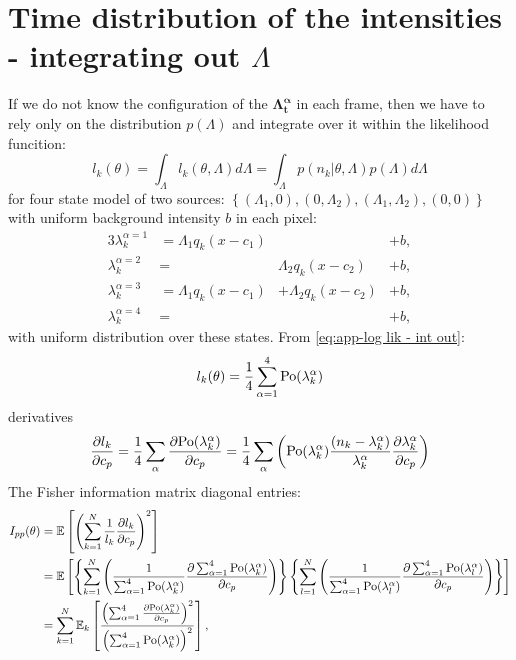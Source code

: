 
\section{Time distribution of the intensities - integrating out $\Lambda$}
\label{sub:Appendix Time-distribution-Integrating out}
If we do not know the configuration of the $\bm{\Lambda^\alpha_t}$ in each frame, then we have to rely only on the distribution $p(\Lambda)$ and integrate over it within the likelihood funcition:
%
\begin{equation}
	l_k(\theta)=\int_{\Lambda}l_k(\theta,\Lambda)d\Lambda=\int_{\Lambda}p(n_k|\theta,\Lambda)p(\Lambda)d\Lambda
	\label{eq:app-log lik - int out}
\end{equation}
%
for four state model of two sources: $\left\{ (\Lambda_1,0),(0,\Lambda_2),(\Lambda_1,\Lambda_2),(0,0)\right\}$ with uniform background intensity $b$ in each pixel: 
\begin{alignat}{3}
	\lambda_k^{\alpha=1}&=\Lambda_1q_k(x-c_1) & &+b,\nonumber\\ 
	\lambda_k^{\alpha=2}&=&\Lambda_2q_k(x-c_2) &+b,\nonumber\\ 
	\lambda_k^{\alpha=3}&=\Lambda_1q_k(x-c_1)&+\Lambda_2q_k(x-c_2)&+b,\nonumber\\ 
	\lambda_k^{\alpha=4}&=& &+b,
\end{alignat}
%
with uniform distribution over these states. From \autoref{eq:app-log lik - int out}:
%
\begin{equation}
	l_k(\theta)=\frac{1}{4}\sum_{\alpha=1}^4\mathrm{Po}(\lambda_k^\alpha)
\end{equation}
%
derivatives 
%
\begin{equation}
	\frac{\partial l_k}{\partial c_p}=\frac{1}{4}\sum_\alpha\frac{\partial\mathrm{Po}(\lambda_k^\alpha)}{\partial c_p}=\frac{1}{4}\sum_\alpha\left(\mathrm{Po}(\lambda_k^\alpha)\frac{(n_k-\lambda_k^\alpha)}{\lambda_k^\alpha}\frac{\partial\lambda_k^\alpha}{\partial c_p}\right)
\end{equation}
%
The Fisher information matrix diagonal entries:
%
\begin{alignat}{1}
	I_{pp}(\theta) & =\mathbb{E}\left[\left(\sum_{k=1}^N\frac{1}{l_k}\frac{\partial l_k}{\partial c_p}\right)^2\right]\nonumber \\
 	& =\mathbb{E}\left[\left\{ \sum_{k=1}^N\left(\frac{1}{\sum_{\alpha=1}^4\mathrm{Po}(\lambda_k^\alpha)}\frac{\partial\sum_{\alpha=1}^4\mathrm{Po}(\lambda_k^\alpha)}{\partial c_p}\right)\right\} \left\{ \sum_{l=1}^N\left(\frac{1}{\sum_{\alpha=1}^4\mathrm{Po}(\lambda_l^\alpha)}\frac{\partial\sum_{\alpha=1}^4\mathrm{Po}(\lambda_l^\alpha)}{\partial c_p}\right)\right\} \right]\nonumber \\
	& =\sum_{k=1}^N\mathbb{E}_k\left[\frac{\left(\sum_{\alpha=1}^4\frac{\partial\mathrm{Po}(\lambda_k^\alpha)}{\partial c_p}\right)^2}{\left(\sum_{\alpha=1}^4\mathrm{Po}(\lambda_k^\alpha)\right)^2}\right],
	\label{eq:app-Fisher Info Integrated Out - diagonal entries}
\end{alignat}
